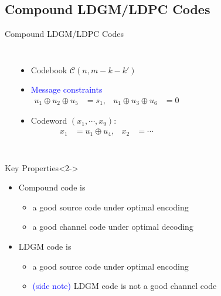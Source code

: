 \documentclass[10pt,presentation]{beamer}
\def\side_information_path{../compound-codes/isit14/slides/Figures}
\begin{document}
\subsection{Compound LDGM/LDPC Codes}
\begin{frame}{Compound LDGM/LDPC Codes}
  \begin{columns}
    \begin{center}
      \setlength\tikzheight{5cm}
      \setlength\tikzwidth{6cm}
      \scalebox{0.5}{}
    \end{center}
    \begin{itemize}
    \item Codebook $\mathcal{C}(n,m-k-k')$ \vspace{0.1cm}
    \item \textcolor{blue}{Message constraints} \vspace{-0.2cm}
      \begin{align*}
        u_1\oplus u_2 \oplus u_5&=s_1, &  u_1\oplus u_3 \oplus u_6&=0
      \end{align*}
    \item Codeword $(x_1,\cdots,x_9)$: \vspace{-0.2cm}
      \begin{align*}
        x_1 &= u_1 \oplus u_4, & x_2 &= \cdots
      \end{align*}
    \end{itemize}
  \end{columns}
  \begin{block}{Key Properties}<2->
    \begin{itemize}
    \item Compound code is 
      \begin{itemize}
      \item a \alert{good source code} under optimal encoding
      \item a \alert{good channel code} under optimal decoding
      \end{itemize}
     \item LDGM code is 
       \begin{itemize}
       \item a \alert{good source code} under optimal encoding
       \item \textcolor{blue}{(side note)} LDGM code is \alert{not} a good channel code
       \end{itemize}
    \end{itemize}
  \end{block}
\end{frame}
\end{document}
